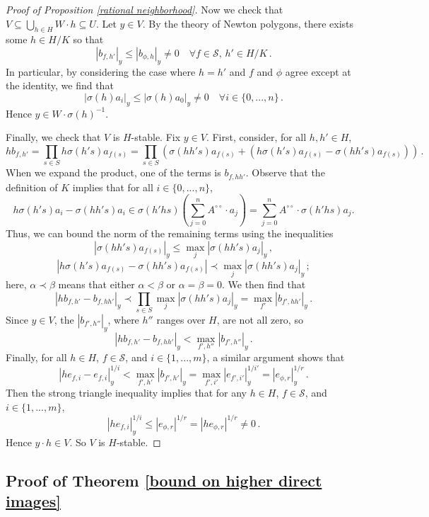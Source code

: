 \documentclass{amsart}
\theoremstyle{remark}
\numberwithin{equation}{subsection}
\renewcommand{\(}{\left(}
\renewcommand{\)}{\right)}
\begin{document}
\begin{proof}[Proof of Proposition \ref{rational neighborhood}]
Now we check that $V \subseteq \bigcup_{h \in H} W \cdot h \subseteq U$.
Let $y \in V$.  By the theory of Newton polygons, there exists some
$h \in H/K$ so that
\[ |b_{f,h'}|_y \le |b_{\phi,h}|_y \ne 0 \quad \forall f \in \mathscr{S},\, h' \in H/K \,. \]
In particular, by considering the case where $h=h'$ and $f$ and $\phi$ agree except at the identity, we find that
\[ |\sigma(h) a_i|_y \le |\sigma(h) a_0|_y \ne 0 \quad \forall i \in \{0,...,n\} \,. \]
Hence $y \in W \cdot \sigma(h)^{-1}$.

Finally, we check that $V$ is $H$-stable.  Fix $y \in V$.
First, consider, for all $h,h' \in H$,
\[ hb_{f,h'} = \prod_{s \in S} h \sigma(h's) a_{f(s)} = \prod_{s \in S} \left( \sigma(hh's) a_{f(s)} + \left( h \sigma(h's) a_{f(s)} - \sigma(hh's) a_{f(s)} \right) \right) \,. \]
When we expand the product, one of the terms is $b_{f,hh'}$.
Observe that the definition of $K$ implies that for all $i \in \{0,...,n\}$,
\[ h\sigma(h's)a_i - \sigma(hh's)a_i \in \sigma(h'hs)\left(\sum^n_{j=0} A^{\circ\circ} \cdot a_j \right)= \sum^n_{j=0}A^{\circ\circ} \cdot \sigma(h'hs)a_j. \]
Thus, we can bound the norm of the remaining terms using the inequalities
\[ |\sigma(hh's) a_{f(s)}|_y \le \max_j |\sigma(hh's) a_j|_y \,, \]
\[ \left|h \sigma(h's) a_{f(s)} - \sigma(hh's) a_{f(s)} \right| \prec \max_j |\sigma(hh's) a_j|_y \,; \]
here, $\alpha \prec \beta$ means that either
$\alpha < \beta$ or $\alpha = \beta = 0$.
We then find that
\[ |hb_{f,h'} - b_{f,hh'}|_y \prec \prod_{s \in S} \max_j |\sigma(hh's) a_j|_y = \max_{f'} |b_{f',hh'}|_y \,. \]
Since $y \in V$, the $|b_{f',h''}|_y$, where $h''$ ranges over $H$, are not all zero, so
\[ |hb_{f,h'}-b_{f,hh'}|_y < \max_{f',h''} |b_{f',h''}|_y \,. \]
Finally, for all $h \in H$, $f \in \mathscr{S}$, and $i \in \{1,...,m\}$,
a similar argument shows that
\[ |he_{f,i}-e_{f,i}|_y^{1/i} < \max_{f',h'} |b_{f',h'}|_y = \max_{f',i'} |e_{f',i'}|_y^{1/i'} = |e_{\phi,r}|_y^{1/r}  \,. \]
Then the strong triangle inequality implies that for any $h \in H$,
$f \in \mathscr{S}$, and $i \in \{1,...,m\}$,
\[ |he_{f,i}|_y^{1/i} \le |e_{\phi,r}|^{1/r} = |he_{\phi,r}|^{1/r} \ne 0 \,. \]
Hence $y \cdot h \in V$.  So $V$ is $H$-stable.
\end{proof}

\subsection{Proof of Theorem \ref{bound on higher direct images}}\label{sec: proof of main thm}
\end{document}
